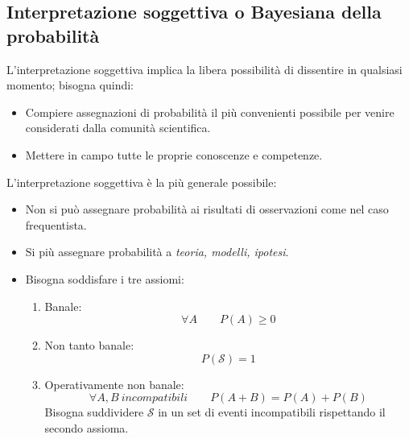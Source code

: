 \documentclass[11pt,a4paper]{book}
\begin{document}
\subsection{Interpretazione soggettiva o Bayesiana della probabilità} 
L'interpretazione soggettiva implica la libera possibilità di dissentire in qualsiasi momento; bisogna quindi:
\begin{itemize}
\item Compiere assegnazioni di probabilità il più convenienti possibile per venire considerati dalla comunità scientifica.
\item Mettere in campo tutte le proprie conoscenze e competenze.
\end{itemize}
L'interpretazione soggettiva è la più generale possibile:
\begin{itemize}
\item Non si può assegnare probabilità ai risultati di osservazioni come nel caso frequentista.
\item Si più assegnare probabilità a \textit{teoria, modelli, ipotesi}.
\item Bisogna soddisfare i tre assiomi:
\begin{enumerate}
\item Banale:
\begin{equation}
\forall A \qquad P(A)\geq 0
\end{equation}
\item Non tanto banale:
\begin{equation}
P(\mathcal{S}) = 1
\end{equation}
\item Operativamente non banale:
\begin{equation}
\forall A, B \ \textit{incompatibili} \qquad P(A+B) =P(A)+P(B)
\end{equation}
Bisogna suddividere $ \mathcal{S} $ in un set di eventi incompatibili rispettando il secondo assioma.
\end{enumerate}
\end{itemize}
\end{document}
